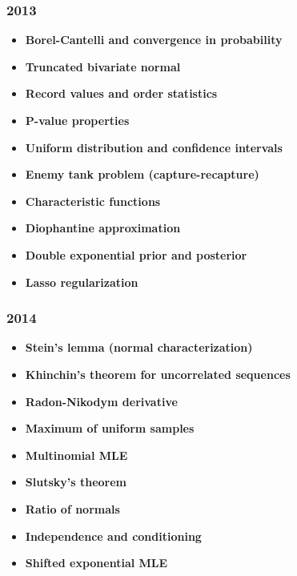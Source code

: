 \subsubsection*{2013}
\begin{itemize}
    \item \textbf{Borel-Cantelli and convergence in probability}
    \item \textbf{Truncated bivariate normal}
    \item \textbf{Record values and order statistics}
    \item \textbf{P-value properties}
    \item \textbf{Uniform distribution and confidence intervals}
    \item \textbf{Enemy tank problem (capture-recapture)}
    \item \textbf{Characteristic functions}
    \item \textbf{Diophantine approximation}
    \item \textbf{Double exponential prior and posterior}
    \item \textbf{Lasso regularization}
\end{itemize}

\subsubsection*{2014}
\begin{itemize}
    \item \textbf{Stein's lemma (normal characterization)}
    \item \textbf{Khinchin's theorem for uncorrelated sequences}
    \item \textbf{Radon-Nikodym derivative}
    \item \textbf{Maximum of uniform samples}
    \item \textbf{Multinomial MLE}
    \item \textbf{Slutsky's theorem}
    \item \textbf{Ratio of normals}
    \item \textbf{Independence and conditioning}
    \item \textbf{Shifted exponential MLE}
\end{itemize}

